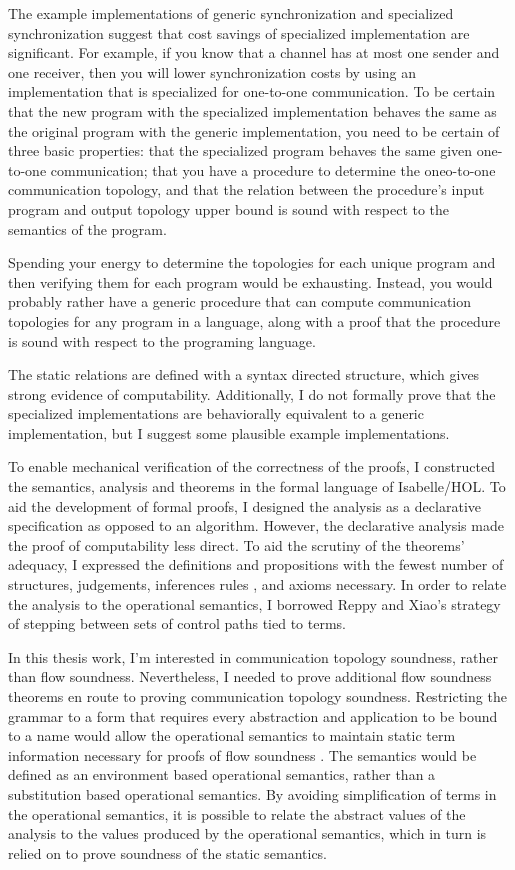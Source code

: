 \documentclass{article}
\begin{document}
The example implementations of generic synchronization and specialized synchronization suggest
that cost savings of specialized implementation are significant.  For example, if you know that
a channel has at most one sender and one receiver, then you will lower synchronization costs by
using an implementation that is specialized for one-to-one communication.  To be certain that
the new program with the specialized implementation behaves the same as the original program
with the generic implementation, you need to be certain of three basic properties: that the
specialized program behaves the same given one-to-one communication; that you have a procedure
to determine the oneo-to-one communication topology, and that the relation between the
procedure's input program and output topology upper bound is sound with respect to the semantics
of the program.  

Spending your energy to determine the topologies for each unique program and then verifying
them for each program would be exhausting. Instead, you would probably rather have a generic
procedure that can compute communication topologies for any program in a language, along with
a proof that the procedure is sound with respect to the programing language.

The static relations are defined
with a syntax directed structure, which gives strong evidence of computability.  Additionally,
I do not formally prove that the specialized implementations are behaviorally equivalent to a
generic implementation, but I suggest some plausible example implementations.

To enable mechanical verification of the correctness of the proofs, I constructed the
semantics, analysis and theorems in the formal language of Isabelle/HOL.  To aid the
development of formal proofs, I designed the analysis as a declarative specification as
opposed to an algorithm.  However, the declarative analysis made the proof of
computability less direct.  To aid the scrutiny of the theorems' adequacy, I expressed the
definitions and propositions with the fewest number of structures, judgements, inferences rules
, and axioms necessary. In order to relate the analysis to the operational semantics, I
borrowed Reppy and Xiao's strategy of stepping between sets of control paths tied to terms.

In this thesis work, I'm interested in communication topology soundness, rather than flow
soundness.  Nevertheless, I needed to prove additional flow soundness theorems en route to
proving communication topology soundness.  Restricting the grammar to a form that requires
every abstraction and application to be bound to a name would allow the operational
semantics to maintain static term information necessary for proofs of flow soundness \cite{}.
The semantics would be defined as an environment based operational semantics, rather than a
substitution based operational semantics.  By avoiding simplification of terms in the
operational semantics, it is possible to relate the abstract values of the analysis to the
values produced by the operational semantics, which in turn is relied on to prove 
soundness of the static semantics.
\end{document}
